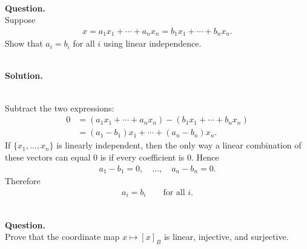 \documentclass{article}
\begin{document}
\bigskip

\hfill \break  $~\!\!$ \dotfill \medskip \\
\textbf{Question.}\\
Suppose
\begin{align*}
x = a_1 x_1 + \cdots + a_n x_n = b_1 x_1 + \cdots + b_n x_n.
\end{align*}
Show that $a_i = b_i$ for all $i$ using linear independence.

\noindent\\
\textbf{Solution.}\\
\quad\\
\begin{mdframed}[linewidth=1pt]
Subtract the two expressions:
\begin{align*}
0
&=(a_1x_1+\cdots+a_nx_n)-(b_1x_1+\cdots+b_nx_n) \\
&=(a_1-b_1)x_1+\cdots+(a_n-b_n)x_n.
\end{align*}
If $\{x_1,\dots,x_n\}$ is linearly independent, then the only way a linear combination of these vectors can equal $0$ is if every coefficient is $0$. Hence
\begin{align*}
a_1-b_1=0,\quad \dots,\quad a_n-b_n=0.
\end{align*}
Therefore
\begin{align*}
a_i=b_i\qquad \text{for all }i.
\end{align*}
\end{mdframed}

\bigskip

\hfill \break  $~\!\!$ \dotfill \medskip \\
\textbf{Question.}\\
Prove that the coordinate map $x \mapsto [x]_B$ is linear, injective, and surjective.
\end{document}

